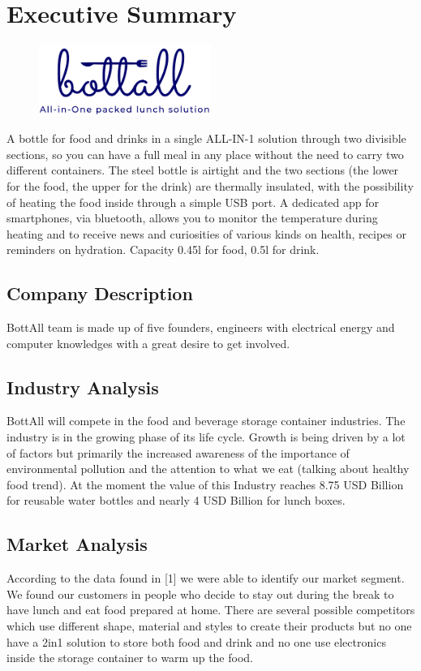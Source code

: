 \section{Executive Summary}
\begin{figure}[]
\centering
\includegraphics[width=0.5\textwidth]{logo.PNG}
\end{figure}

A bottle for food and drinks in a single ALL-IN-1 solution through two divisible sections, so you can have a full meal in any place without the need to carry two different containers. The steel bottle is airtight and the two sections (the lower for the food, the upper for the drink) are thermally insulated, with the possibility of heating the food inside through a simple USB port. A dedicated app for smartphones, via bluetooth, allows you to monitor the temperature during heating and to receive news and curiosities of various kinds on health, recipes or reminders on hydration. Capacity 0.45l for food, 0.5l for drink.
\subsection{Company Description}
BottAll team is made up of five founders, engineers with electrical energy and computer knowledges with a great desire to get involved.
\subsection{Industry Analysis}
BottAll will compete in the food and beverage storage container industries. The industry is in the growing phase of its life cycle. Growth is being driven by a lot of factors but primarily the increased awareness of the importance of environmental pollution and the attention to what we eat (talking about healthy food trend). At the moment the value of this Industry reaches 8.75 USD Billion for reusable water bottles and nearly 4 USD Billion for lunch boxes. 
 
\subsection{Market Analysis} 
According to the data found in [1] we were able to identify our market segment. We found our customers in people who decide to stay out during the break to have lunch and eat food prepared at home. There are several possible competitors which use different shape, material and styles to create their products but no one have a 2in1 solution to store both food and drink and no one use electronics inside the storage container to warm up the food. 

